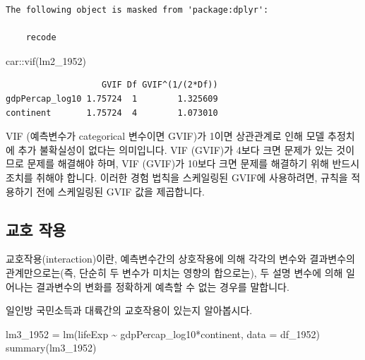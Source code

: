 \documentclass[
  letterpaper,
  DIV=11,
  numbers=noendperiod]{scrartcl}
\newenvironment{Shaded}{\begin{snugshade}}{\end{snugshade}}
\newcommand{\AttributeTok}[1]{\textcolor[rgb]{0.40,0.45,0.13}{#1}}
\newcommand{\FunctionTok}[1]{\textcolor[rgb]{0.28,0.35,0.67}{#1}}
\newcommand{\NormalTok}[1]{\textcolor[rgb]{0.00,0.23,0.31}{#1}}
\newcommand{\OtherTok}[1]{\textcolor[rgb]{0.00,0.23,0.31}{#1}}
\newcommand{\SpecialCharTok}[1]{\textcolor[rgb]{0.37,0.37,0.37}{#1}}
\begin{document}
\begin{verbatim}
The following object is masked from 'package:dplyr':

    recode
\end{verbatim}

\begin{Shaded}
\begin{Highlighting}[]
\NormalTok{car}\SpecialCharTok{::}\FunctionTok{vif}\NormalTok{(lm2\_1952)}
\end{Highlighting}
\end{Shaded}

\begin{verbatim}
                   GVIF Df GVIF^(1/(2*Df))
gdpPercap_log10 1.75724  1        1.325609
continent       1.75724  4        1.073010
\end{verbatim}

VIF (예측변수가 categorical 변수이면 GVIF)가 1이면 상관관계로 인해 모델
추정치에 추가 불확실성이 없다는 의미입니다. VIF (GVIF)가 4보다 크면
문제가 있는 것이므로 문제를 해결해야 하며, VIF (GVIF)가 10보다 크면
문제를 해결하기 위해 반드시 조치를 취해야 합니다. 이러한 경험 법칙을
스케일링된 GVIF에 사용하려면, 규칙을 적용하기 전에 스케일링된 GVIF 값을
제곱합니다.

\hypertarget{uxad50uxd638-uxc791uxc6a9}{%
\subsection{교호 작용}\label{uxad50uxd638-uxc791uxc6a9}}

교호작용(interaction)이란, 예측변수간의 상호작용에 의해 각각의 변수와
결과변수의 관계만으로는(즉, 단순히 두 변수가 미치는 영향의 합으로는), 두
설명 변수에 의해 일어나는 결과변수의 변화를 정확하게 예측할 수 없는
경우를 말합니다.

일인방 국민소득과 대륙간의 교호작용이 있는지 알아봅시다.

\begin{Shaded}
\begin{Highlighting}[]
\NormalTok{lm3\_1952 }\OtherTok{=} \FunctionTok{lm}\NormalTok{(lifeExp }\SpecialCharTok{\textasciitilde{}}\NormalTok{ gdpPercap\_log10}\SpecialCharTok{*}\NormalTok{continent, }
             \AttributeTok{data =}\NormalTok{ df\_1952)}
\FunctionTok{summary}\NormalTok{(lm3\_1952)}
\end{Highlighting}
\end{Shaded}
\end{document}
